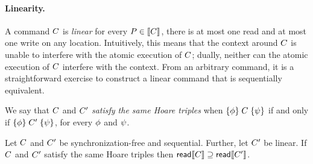 \paragraph{Linearity.}
A command $C$ is \emph{linear} for every $P\in\llbracket C\rrbracket$, there is
at most one read and at most one write on any location.  Intuitively, this
means that the context around $C$ is unable to interfere with the atomic
execution of $C$; dually, neither can the atomic execution of $C$
interfere with the context.  From an arbitrary command, it is a
straightforward exercise to construct a linear command that is sequentially
equivalent.

We say that $C$ and $C'$ \emph{satisfy the same Hoare triples} when
$\{\phi\}\allowbreak\;C\;\allowbreak\{\psi\}$ if and only if
$\{\phi\}\allowbreak\;C'\;\allowbreak\{\psi\}$, for every $\phi$ and $\psi$.

\begin{corollary}\label{seqcompleteness}
  Let $C$ and $C'$ be synchronization-free and sequential.  Further,
  let $C'$ be linear.
  If $C$ and $C'$ satisfy the same Hoare
  triples then $\mathsf{read}\llbracket C\rrbracket \supseteq \mathsf{read}\llbracket C'\rrbracket$.
%    
\end{corollary}

